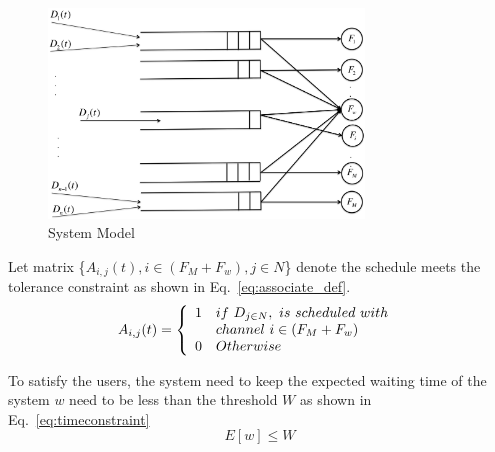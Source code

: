 




\begin{figure}
\vspace{-0.0in}
\centering
\includegraphics[width=84mm]{figures/flowconfig}
\vspace{-0.1in}
\caption{System Model}
\label{fig:flowconfig}
\vspace{-0.1in}
\end{figure}


Let matrix \{$A_{i,j}(t),i\in (F_M+F_w), j\in N$\} denote the schedule meets the 
tolerance constraint as shown in Eq.~\ref{eq:associate_def}.
\begin{equation}
\label{eq:associate_def}
 A_{i,j}(t) = \left\{ 
	  \begin{array}{l l}
	    1   &  if\ D_{j\in N},\ is\ scheduled\ with\ \\
		& channel\ i \in (F_M+F_w) \\
		0 &  Otherwise
			    \end{array} \right.
\end{equation}


To satisfy the users, the system need to keep the expected waiting time of the system $w$ need to be less than the 
threshold $W$ as shown in Eq.~\ref{eq:timeconstraint}
\begin{equation}
\label{eq:timeconstraint}
E[w]\le W
\end{equation}


